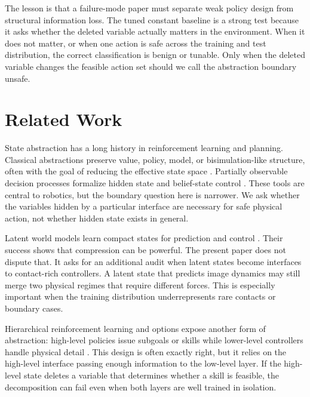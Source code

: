 \documentclass{article}
\begin{document}


The lesson is that a failure-mode paper must separate weak policy design from
structural information loss. The tuned constant baseline is a strong test because
it asks whether the deleted variable actually matters in the environment. When
it does not matter, or when one action is safe across the training and test
distribution, the correct classification is benign or tunable. Only when the
deleted variable changes the feasible action set should we call the abstraction
boundary unsafe.

\section{Related Work}

State abstraction has a long history in reinforcement learning and planning.
Classical abstractions preserve value, policy, model, or bisimulation-like
structure, often with the goal of reducing the effective state space
\citep{li2006state, sutton1999options, konidaris2019necessity}. Partially
observable decision processes formalize hidden state and belief-state control
\citep{kaelbling1998pomdp}. These tools are central to robotics, but the
boundary question here is narrower. We ask whether the variables hidden by a
particular interface are necessary for safe physical action, not whether hidden
state exists in general.

Latent world models learn compact states for prediction and control
\citep{ha2018world, hafner2019planet, hafner2020dreamer}. Their success shows
that compression can be powerful. The present paper does not dispute that. It
asks for an additional audit when latent states become interfaces to contact-rich
controllers. A latent state that predicts image dynamics may still merge two
physical regimes that require different forces. This is especially important
when the training distribution underrepresents rare contacts or boundary cases.

Hierarchical reinforcement learning and options expose another form of
abstraction: high-level policies issue subgoals or skills while lower-level
controllers handle physical detail \citep{sutton1999options, barto2003recent}.
This design is often exactly right, but it relies on the high-level interface
passing enough information to the low-level layer. If the high-level state
deletes a variable that determines whether a skill is feasible, the decomposition
can fail even when both layers are well trained in isolation.
\end{document}
